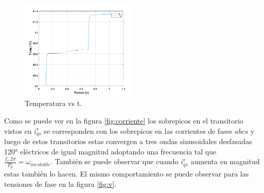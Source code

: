 \documentclass[10pt]{article}
\begin{document}
\begin{itemize}
	\begin{figure}[h!]
	\centering
	\includegraphics[width=0.5\textwidth]{temperatura.png}
	\caption{\label{fig:temperatura} Temperatura vs t.}
	\end{figure}
	\newpage
	Como se puede ver en la figura \ref{fig:corriente} los sobrepicos en el transitorio vistos en $i^{r}_{qs}$ se corresponden con los sobrepicos en las corrientes de fases $abcs$ y luego de estos transitorios estas convergen a tres ondas sinusoidales desfasadas 120° eléctricos de igual magnitud adoptando una frecuencia tal que $\frac{f_{e}.2\pi}{P_{p}}=\omega_{mestable}$. También se puede observar que cuando $i^{r}_{qs}$ aumenta en magnitud estas también lo hacen. El mismo comportamiento se puede observar para las tensiones de fase en la figura \ref{fig:v}.




\end{itemize}
\end{document}
